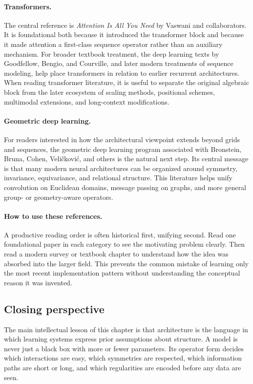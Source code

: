 \paragraph{Transformers.}
The central reference is \emph{Attention Is All You Need} by Vaswani and collaborators.
It is foundational both because it introduced the transformer block and because it made attention a first-class sequence operator rather than an auxiliary mechanism.
For broader textbook treatment, the deep learning texts by Goodfellow, Bengio, and Courville, and later modern treatments of sequence modeling, help place transformers in relation to earlier recurrent architectures.
When reading transformer literature, it is useful to separate the original algebraic block from the later ecosystem of scaling methods, positional schemes, multimodal extensions, and long-context modifications.

\paragraph{Geometric deep learning.}
For readers interested in how the architectural viewpoint extends beyond grids and sequences, the geometric deep learning program associated with Bronstein, Bruna, Cohen, Veli\v{c}kovi\'{c}, and others is the natural next step.
Its central message is that many modern neural architectures can be organized around symmetry, invariance, equivariance, and relational structure.
This literature helps unify convolution on Euclidean domains, message passing on graphs, and more general group- or geometry-aware operators.

\paragraph{How to use these references.}
A productive reading order is often historical first, unifying second.
Read one foundational paper in each category to see the motivating problem clearly.
Then read a modern survey or textbook chapter to understand how the idea was absorbed into the larger field.
This prevents the common mistake of learning only the most recent implementation pattern without understanding the conceptual reason it was invented.

\subsection*{Closing perspective}

The main intellectual lesson of this chapter is that architecture is the language in which learning systems express prior assumptions about structure.
A model is never just a black box with more or fewer parameters.
Its operator form decides which interactions are easy, which symmetries are respected, which information paths are short or long, and which regularities are encoded before any data are seen.

